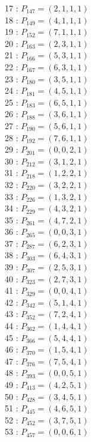\documentclass{article}
\begin{document}
{\begin{multicols}{3}
17 : $P_{147}=( 2, 1, 1, 1 )$\\
18 : $P_{149}=( 4, 1, 1, 1 )$\\
19 : $P_{152}=( 7, 1, 1, 1 )$\\
20 : $P_{163}=( 2, 3, 1, 1 )$\\
21 : $P_{166}=( 5, 3, 1, 1 )$\\
22 : $P_{167}=( 6, 3, 1, 1 )$\\
23 : $P_{180}=( 3, 5, 1, 1 )$\\
24 : $P_{181}=( 4, 5, 1, 1 )$\\
25 : $P_{183}=( 6, 5, 1, 1 )$\\
26 : $P_{188}=( 3, 6, 1, 1 )$\\
27 : $P_{190}=( 5, 6, 1, 1 )$\\
28 : $P_{192}=( 7, 6, 1, 1 )$\\
29 : $P_{201}=( 0, 0, 2, 1 )$\\
30 : $P_{212}=( 3, 1, 2, 1 )$\\
31 : $P_{218}=( 1, 2, 2, 1 )$\\
32 : $P_{220}=( 3, 2, 2, 1 )$\\
33 : $P_{226}=( 1, 3, 2, 1 )$\\
34 : $P_{229}=( 4, 3, 2, 1 )$\\
35 : $P_{261}=( 4, 7, 2, 1 )$\\
36 : $P_{265}=( 0, 0, 3, 1 )$\\
37 : $P_{287}=( 6, 2, 3, 1 )$\\
38 : $P_{303}=( 6, 4, 3, 1 )$\\
39 : $P_{307}=( 2, 5, 3, 1 )$\\
40 : $P_{323}=( 2, 7, 3, 1 )$\\
41 : $P_{329}=( 0, 0, 4, 1 )$\\
42 : $P_{342}=( 5, 1, 4, 1 )$\\
43 : $P_{352}=( 7, 2, 4, 1 )$\\
44 : $P_{362}=( 1, 4, 4, 1 )$\\
45 : $P_{366}=( 5, 4, 4, 1 )$\\
46 : $P_{370}=( 1, 5, 4, 1 )$\\
47 : $P_{376}=( 7, 5, 4, 1 )$\\
48 : $P_{393}=( 0, 0, 5, 1 )$\\
49 : $P_{413}=( 4, 2, 5, 1 )$\\
50 : $P_{428}=( 3, 4, 5, 1 )$\\
51 : $P_{445}=( 4, 6, 5, 1 )$\\
52 : $P_{452}=( 3, 7, 5, 1 )$\\
53 : $P_{457}=( 0, 0, 6, 1 )$\\

\end{multicols}}
\end{document}

